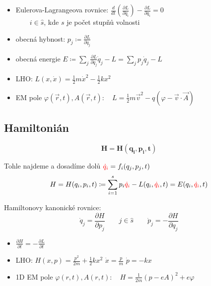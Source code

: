\documentclass[a5paper,12pt]{article}
\begin{document}
\begin{itemize}
	\item Eulerova-Lagrangeova rovnice: $\frac{d}{dt} (\frac{\partial L}{\partial \dot{q}_i}) - \frac{\partial L}{\partial q_i} = 0$\\
	$\qquad i \in \hat{s}$, kde $s$ je počet stupňů volnosti
	\item obecná hybnost: $p_j \coloneqq \frac{\partial L}{\partial \dot{q}_j}$
	\item obecná energie $E \coloneqq \sum_{j} \frac{\partial L}{\partial \dot{q}_j}\dot{q}_j - L = \sum_{j} p_j\dot{q}_j - L$
	\item LHO: $L(x, \dot{x}) = \frac{1}{2}m\dot{x}^2 - \frac{1}{2}kx^2$
	\item EM pole $\varphi(\vec{r}, t), A(\vec{r}, t): \quad L = \frac{1}{2}m\vec{v}^2 - q(\varphi - \vec{v} \cdot \vec{A})$
\end{itemize}

\subsection{Hamiltonián}

\begin{equation*}
	\boldsymbol{H=H(q_i, p_i, t)}
\end{equation*}

Tohle najdeme a dosadíme dolů ${\color{red} \dot{q}_i} = f_i(q_j, p_j, t)$
\begin{equation*}
	H = H(q_i, p_i, t) \coloneqq \sum^{s}_{i=1} p_i {\color{red} \dot{q}_i} - L(q_i, {\color{red} \dot{q}_i}, t) = E(q_i, {\color{red} \dot{q}_i}, t)
\end{equation*}

Hamiltonovy kanonické rovnice:
\begin{equation*}
\boxed{
	\dot{q}_j = \frac{\partial H}{\partial p_j}
}
	\qquad j \in \hat{s} \qquad
\boxed{
	\dot{p}_j = - \frac{\partial H}{\partial q_j} 
}
\end{equation*}

\begin{itemize}
	\item $\frac{\partial H}{\partial t} = - \frac{\partial L}{\partial t}$
	\item LHO: $H(x, p) = \frac{p^2}{2m} + \frac{1}{2}kx^2$ \qquad
	$\dot{x} = \frac{p}{m}$ \qquad
	$\dot{p} = -kx$
	\item 1D EM pole $\varphi(r, t), A(r, t): \quad H = \frac{1}{2m}(p - eA)^2 + e\varphi$
	
\end{itemize}
\end{document}
